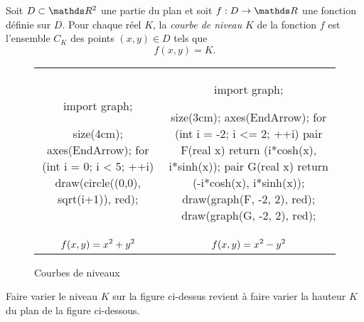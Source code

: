 \begin{defn}
	Soit $D \subset \R^2$ une partie du plan et soit $f: D \to \R$ une fonction définie sur $D$.
	Pour chaque réel $K$, la \textit{courbe de niveau} $K$ de la fonction $f$ est l'ensemble $C_K$ des points $(x,y) \in D$ tels que \[
		f(x,y) = K
	.\]
\end{defn}

\begin{figure}[H]
	\centering
	\begin{tabular}{cc}
		\begin{asy}
			import graph;

			size(4cm);
			axes(EndArrow);
			for (int i = 0; i < 5; ++i) {
				draw(circle((0,0), sqrt(i+1)), red);
			}
		\end{asy}
		&
		\begin{asy}
			import graph;

			size(3cm);
			axes(EndArrow);
			for (int i = -2; i <= 2; ++i) {
				pair F(real x) { return (i*cosh(x), i*sinh(x)); }
				pair G(real x) { return (-i*cosh(x), i*sinh(x)); }
				draw(graph(F, -2, 2), red);
				draw(graph(G, -2, 2), red);
			}
		\end{asy}
		\\
		$\displaystyle f(x,y) = x^2 + y^2$ & $\displaystyle f(x,y) = x^2 - y^2$ 
	\end{tabular}
	\caption{Courbes de niveaux}
\end{figure}

Faire varier le niveau $K$ sur la figure ci-dessus revient à faire varier la hauteur $K$ du plan de la figure ci-dessous.

